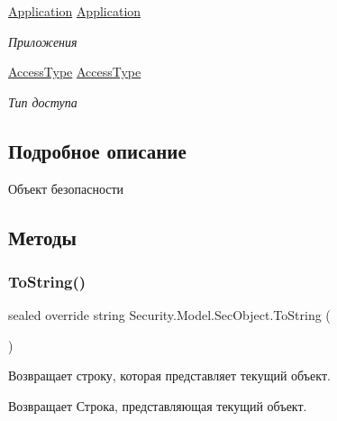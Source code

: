 \begin{DoxyCompactItemize}
\hyperlink{class_security_1_1_model_1_1_application}{Application} \hyperlink{class_security_1_1_model_1_1_sec_object_a583462ae3e230d57d78b5abdf311442b}{Application}
\begin{DoxyCompactList}\small\item\em Приложения \end{DoxyCompactList}\item 
\hyperlink{class_security_1_1_model_1_1_access_type}{Access\+Type} \hyperlink{class_security_1_1_model_1_1_sec_object_a1933bf3c276e22a5c2f3d915ad98e1a7}{Access\+Type}
\begin{DoxyCompactList}\small\item\em Тип доступа \end{DoxyCompactList}\end{DoxyCompactItemize}


\subsection{Подробное описание}
Объект безопасности 



\subsection{Методы}
\mbox{\label{class_security_1_1_model_1_1_sec_object_aa5e3010bbd95a03eeb015c4a54eb003e}} 
\subsubsection{\texorpdfstring{To\+String()}{ToString()}}
{\footnotesize\ttfamily sealed override string Security.\+Model.\+Sec\+Object.\+To\+String (\begin{DoxyParamCaption}{ }\end{DoxyParamCaption})}



Возвращает строку, которая представляет текущий объект. 

\begin{DoxyReturn}{Возвращает}
Строка, представляющая текущий объект. 
\end{DoxyReturn}


